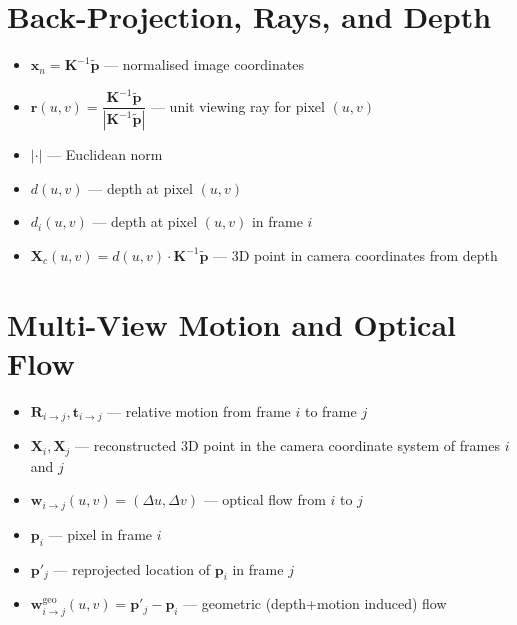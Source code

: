 \section{Back-Projection, Rays, and Depth}
\begin{itemize}
    \item $\mathbf{x}_n = \mathbf{K}^{-1}\tilde{\mathbf{p}}$ --- normalised image coordinates
    \item $\mathbf{r}(u,v) = \dfrac{\mathbf{K}^{-1}\tilde{\mathbf{p}}}{|\mathbf{K}^{-1}\tilde{\mathbf{p}}|}$ --- unit viewing ray for pixel $(u,v)$
    \item $|\cdot|$ --- Euclidean norm
    \item $d(u,v)$ --- depth at pixel $(u,v)$
    \item $d_i(u,v)$ --- depth at pixel $(u,v)$ in frame $i$
    \item $\mathbf{X}_c(u,v) = d(u,v)\cdot \mathbf{K}^{-1}\tilde{\mathbf{p}}$ --- 3D point in camera coordinates from depth
\end{itemize}

\section{Multi-View Motion and Optical Flow}
\begin{itemize}
    \item $\mathbf{R}_{i\to j}, \mathbf{t}_{i\to j}$ --- relative motion from frame $i$ to frame $j$
    \item $\mathbf{X}_i, \mathbf{X}_j$ --- reconstructed 3D point in the camera coordinate system of frames $i$ and $j$
    \item $\mathbf{w}_{i\to j}(u,v) = (\Delta u, \Delta v)$ --- optical flow from $i$ to $j$
    \item $\mathbf{p}_i$ --- pixel in frame $i$
    \item $\mathbf{p}'_j$ --- reprojected location of $\mathbf{p}_i$ in frame $j$
    \item $\mathbf{w}^{\text{geo}}_{i\to j}(u,v) = \mathbf{p}'_j - \mathbf{p}_i$ --- geometric (depth+motion induced) flow
\end{itemize}